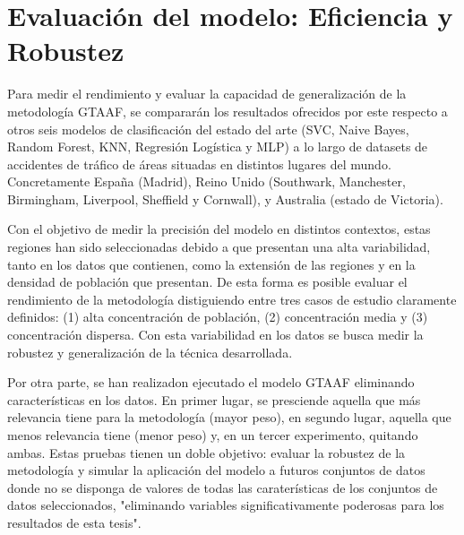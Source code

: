 \documentclass{uathesis-es}
\begin{document}
\section{Evaluación del modelo: Eficiencia y Robustez}

Para medir el rendimiento y evaluar la capacidad de generalización de la metodología GTAAF, se compararán los resultados ofrecidos por este respecto a otros seis modelos de clasificación del estado del arte (SVC, Naive Bayes, Random Forest, KNN, Regresión Logística y MLP) a lo largo de datasets de accidentes de tráfico de áreas situadas en distintos lugares del mundo. Concretamente España (Madrid), Reino Unido (Southwark, Manchester, Birmingham, Liverpool, Sheffield y Cornwall), y Australia (estado de Victoria).

Con el objetivo de medir la precisión del modelo en distintos contextos, estas regiones han sido seleccionadas debido a que presentan una alta variabilidad, tanto en los datos que contienen, como la extensión de las regiones y en la densidad de población que presentan. De esta forma es posible evaluar el rendimiento de la metodología distiguiendo entre tres casos de estudio claramente definidos: (1) alta concentración de población, (2) concentración media y (3) concentración dispersa. Con esta variabilidad en los datos se busca medir la robustez y generalización de la técnica desarrollada.

Por otra parte, se han realizadon ejecutado el modelo GTAAF eliminando características en los datos. En primer lugar, se presciende aquella que más relevancia tiene para la metodología (mayor peso), en segundo lugar, aquella que menos relevancia tiene (menor peso) y, en un tercer experimento, quitando ambas. Estas pruebas tienen un doble objetivo: evaluar la robustez de la metodología y simular la aplicación del modelo a futuros conjuntos de datos donde no se disponga de valores de todas las caraterísticas de los conjuntos de datos seleccionados, "eliminando variables significativamente poderosas para los resultados de esta tesis".
\end{document}
